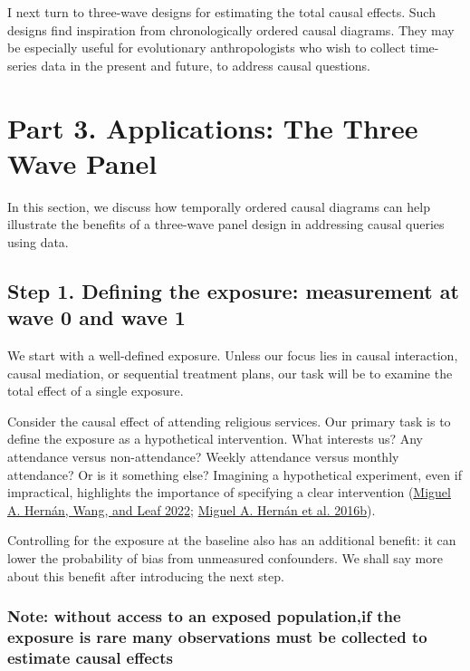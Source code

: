 \documentclass[
  singlecolumn]{report}
\begin{document}
I next turn to three-wave designs for estimating the total causal
effects. Such designs find inspiration from chronologically ordered
causal diagrams. They may be especially useful for evolutionary
anthropologists who wish to collect time-series data in the present and
future, to address causal questions.

\hypertarget{part-3.-applications-the-three-wave-panel}{%
\section{Part 3. Applications: The Three Wave
Panel}\label{part-3.-applications-the-three-wave-panel}}

In this section, we discuss how temporally ordered causal diagrams can
help illustrate the benefits of a three-wave panel design in addressing
causal queries using data.

\hypertarget{step-1.-defining-the-exposure-measurement-at-wave-0-and-wave-1}{%
\subsection{Step 1. Defining the exposure: measurement at wave 0 and
wave
1}\label{step-1.-defining-the-exposure-measurement-at-wave-0-and-wave-1}}

We start with a well-defined exposure. Unless our focus lies in causal
interaction, causal mediation, or sequential treatment plans, our task
will be to examine the total effect of a single exposure.

Consider the causal effect of attending religious services. Our primary
task is to define the exposure as a hypothetical intervention. What
interests us? Any attendance versus non-attendance? Weekly attendance
versus monthly attendance? Or is it something else? Imagining a
hypothetical experiment, even if impractical, highlights the importance
of specifying a clear intervention
(\protect\hyperlink{ref-hernuxe1n2022}{Miguel A. Hernán, Wang, and Leaf
2022}; \protect\hyperlink{ref-hernuxe1n2016a}{Miguel A. Hernán et al.
2016b}).

Controlling for the exposure at the baseline also has an additional
benefit: it can lower the probability of bias from unmeasured
confounders. We shall say more about this benefit after introducing the
next step.

\hypertarget{note-without-access-to-an-exposed-populationif-the-exposure-is-rare-many-observations-must-be-collected-to-estimate-causal-effects}{%
\subsubsection{\texorpdfstring{\textbf{Note: without access to an
exposed population,if the exposure is rare many observations must be
collected to estimate causal
effects}}{Note: without access to an exposed population,if the exposure is rare many observations must be collected to estimate causal effects}}\label{note-without-access-to-an-exposed-populationif-the-exposure-is-rare-many-observations-must-be-collected-to-estimate-causal-effects}}
\end{document}

